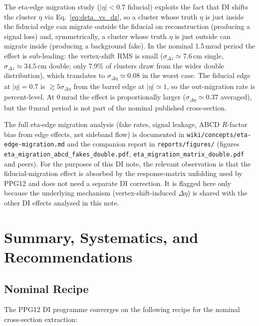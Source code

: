 \documentclass[11pt,a4paper]{article}
\begin{document}
The eta-edge migration study ($|\eta|<0.7$ fiducial) exploits the
fact that DI shifts the cluster $\eta$ via
Eq.~\eqref{eq:deta_vs_dz}, so a cluster whose truth $\eta$ is
just inside the fiducial edge can migrate outside the fiducial on
reconstruction (producing a signal loss) and, symmetrically, a
cluster whose truth $\eta$ is just outside can migrate inside
(producing a background fake). In the nominal 1.5\,mrad period the
effect is sub-leading: the vertex-shift RMS is small
($\sigma_{\Delta z}\simeq 7.6$\,cm single,
$\sigma_{\Delta z}\simeq 34.5$\,cm double; only 7.9\% of clusters
draw from the wider double distribution), which translates to
$\sigma_{\Delta\eta}\simeq 0.08$ in the worst case. The fiducial
edge at $|\eta|=0.7$ is $\gtrsim 5\sigma_{\Delta\eta}$ from the
barrel edge at $|\eta|\simeq 1$, so the out-migration rate is
percent-level. At 0\,mrad the effect is proportionally larger
($\sigma_{\Delta\eta}\simeq 0.37$ averaged), but the 0\,mrad
period is not part of the nominal published cross-section.

The full eta-edge migration analysis (fake rates, signal leakage,
ABCD $R$-factor bias from edge effects, net sideband flow) is
documented in \texttt{wiki/concepts/eta-edge-migration.md} and the
companion report in \texttt{reports/figures/} (figures
\texttt{eta\_migration\_abcd\_fakes\_double.pdf},
\texttt{eta\_migration\_matrix\_double.pdf} and peers). For the
purposes of this DI note, the relevant observation is that the
fiducial-migration effect is absorbed by the response-matrix
unfolding used by PPG12 and does not need a separate DI correction.
It is flagged here only because the underlying mechanism
(vertex-shift-induced $\Delta\eta$) is shared with the other DI
effects analysed in this note.


\section{Summary, Systematics, and Recommendations}
\label{sec:summary}

\subsection{Nominal Recipe}

The PPG12 DI programme converges on the following recipe for the
nominal cross-section extraction:
\end{document}
